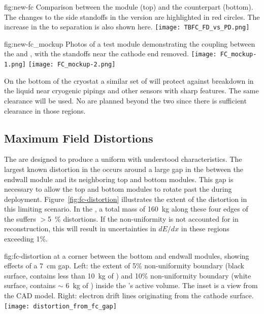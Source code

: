 \begin{dunefigure}
{fig:new-fc}
{Comparison between the   module (top) and the  counterpart (bottom).  The changes to the  side standoffs in the  version are highlighted in red circles.  The increase in the  to  separation is also shown here.} 
\texttt{[image: TBFC\_FD\_vs\_PD.png]}
\end{dunefigure}

\begin{dunefigure}
{fig:new-fc_mockup}
{Photos of a test module demonstrating the coupling between the   and , with the standoffs near the cathode end removed.} %
\texttt{[image: FC\_mockup-1.png]}
\texttt{[image: FC\_mockup-2.png]}
\end{dunefigure}

On the bottom of the cryostat a similar set of  %
will protect against %
breakdown in the liquid near cryogenic pipings and other sensors with sharp features. The same clearance will be used. No  are planned beyond the two  since there is sufficient clearance in those regions.  


\subsection{Maximum Field Distortions}
\label{sec:fdsp-hv-des-fc-mfd}

The  are designed to produce a uniform \efield with understood characteristics.
The largest known \efield distortion in the  occurs around a large gap in the  between the endwall module and its neighboring top and bottom modules. This gap is necessary to allow the top and bottom modules to rotate past the  during deployment.  Figure~\ref{fig:fc-distortion} illustrates the extent of the distortion in this limiting scenario. 
In the , a total \lar mass of \SI{160}{kg} along these four edges of the  suffers $>$\SI{5}{\%} \efield distortions.  If the non-uniformity is not accounted for in reconstruction, this will result in uncertainties in $dE/dx$ in these regions exceeding 1\%. 

\begin{dunefigure}
{fig:fc-distortion}
{\efield at a corner between the bottom and endwall  modules, showing effects of a \SI{7}{cm} gap. Left: the extent of \num{5}\% \efield{} non-uniformity boundary (black surface, contains less than \SI{10}{kg} of \lar) and \num{10}\% non-uniformity boundary (white surface, contains $\sim$ \SI{6}{kg} of \lar) inside the 's active volume. The inset is a view from the CAD model.  Right: electron drift lines originating from the cathode surface.}
\texttt{[image: distortion\_from\_fc\_gap]}
\end{dunefigure}



